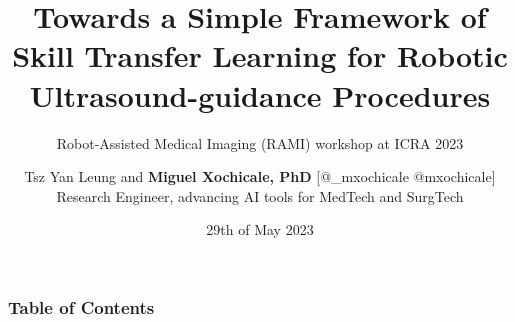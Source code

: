 \documentclass[xcolor={dvipsnames},aspectratio=169,10pt]{beamer}
\title{  
Towards a Simple Framework of Skill Transfer Learning for Robotic Ultrasound-guidance Procedures
}
\subtitle{Robot-Assisted Medical Imaging (RAMI) workshop at ICRA 2023}
\author{
Tsz Yan Leung and
{\bf Miguel Xochicale, PhD} [\faTwitter @\_mxochicale  \faGithub @mxochicale] \\
Research Engineer, advancing AI tools for MedTech and SurgTech 
}
\date{
29th of May 2023
}
\institute{
Advanced Research Computing Centre and WEISS \\
University College London
}
\begin{document}
\maketitle

\begin{frame}
\frametitle{Table of Contents}
    \tableofcontents
\end{frame}


\maketitle


\end{document}
